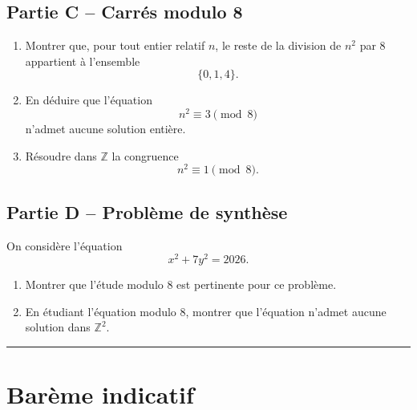 \documentclass[11pt,a4paper]{article}
\newcommand{\Z}{\mathbb{Z}}
\begin{document}
\subsection*{Partie C -- Carrés modulo 8}
\begin{enumerate}[label=\textbf{4.\arabic*}, resume, leftmargin=1.6em]
    \item Montrer que, pour tout entier relatif \(n\), le reste de la division de \(n^2\) par \(8\) appartient à l'ensemble
    \[
    \{0,1,4\}.
    \]
    \item En déduire que l'équation
    \[
    n^2\equiv 3 \pmod 8
    \]
    n'admet aucune solution entière.
    \item Résoudre dans \(\Z\) la congruence
    \[
    n^2\equiv 1 \pmod 8.
    \]
\end{enumerate}

\subsection*{Partie D -- Problème de synthèse}
On considère l'équation
\[
x^2+7y^2=2026.
\]

\begin{enumerate}[label=\textbf{4.\arabic*}, resume, leftmargin=1.6em]
    \item Montrer que l’étude modulo \(8\) est pertinente pour ce problème.
    \item En étudiant l'équation modulo \(8\), montrer que l'équation n'admet aucune solution dans \(\Z^2\).
\end{enumerate}

\vspace{0.7em}
\hrule
\vspace{0.4em}

\section*{Barème indicatif}
\end{document}
